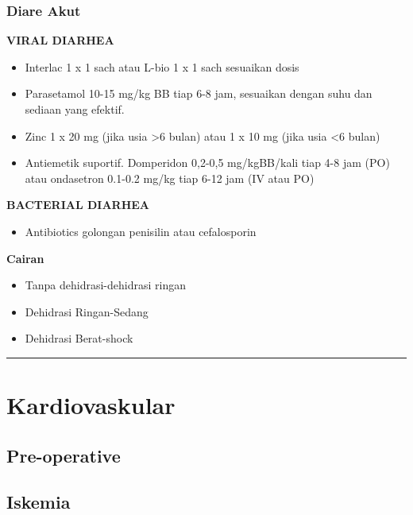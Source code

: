\documentclass[
]{book}
\providecommand{\tightlist}{%
  \setlength{\itemsep}{0pt}\setlength{\parskip}{0pt}}
\begin{document}
\hypertarget{diare-akut}{%
\subsubsection{Diare Akut}\label{diare-akut}}

\textbf{VIRAL DIARHEA}

\begin{itemize}
\tightlist
\item
  Interlac 1 x 1 sach atau L-bio 1 x 1 sach sesuaikan dosis
\item
  Parasetamol 10-15 mg/kg BB tiap 6-8 jam, sesuaikan dengan suhu dan sediaan yang efektif.
\item
  Zinc 1 x 20 mg (jika usia \textgreater6 bulan) atau 1 x 10 mg (jika usia \textless6 bulan)
\item
  Antiemetik suportif. Domperidon 0,2-0,5 mg/kgBB/kali tiap 4-8 jam (PO) atau ondasetron 0.1-0.2 mg/kg tiap 6-12 jam (IV atau PO)
\end{itemize}

\textbf{BACTERIAL DIARHEA}

\begin{itemize}
\tightlist
\item
  Antibiotics golongan penisilin atau cefalosporin
\end{itemize}

\textbf{Cairan}

\begin{itemize}
\tightlist
\item
  Tanpa dehidrasi-dehidrasi ringan
\item
  Dehidrasi Ringan-Sedang
\item
  Dehidrasi Berat-shock
\end{itemize}

\begin{center}\rule{0.5\linewidth}{0.5pt}\end{center}

\hypertarget{kardiovaskular-2}{%
\section{Kardiovaskular}\label{kardiovaskular-2}}

\hypertarget{pre-operative}{%
\subsection{Pre-operative}\label{pre-operative}}

\hypertarget{iskemia}{%
\subsection{Iskemia}\label{iskemia}}
\end{document}
